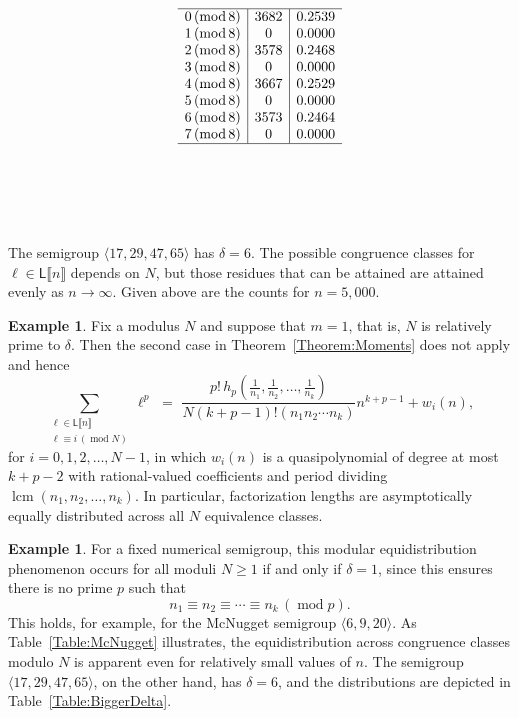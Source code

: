 \documentclass[10pt,reqno]{amsart}
\newcommand{\Le}{\mathsf{L}}
\newcommand{\lcm}{\operatorname{lcm}}
\providecommand{\multi}[1]{\llbracket #1 \rrbracket}
\newcommand{\0}{\color{lightgray}0}
\renewcommand{\pmod}[1]{\,(\operatorname{mod} #1)}
\renewcommand\>{\rangle}
\newcommand\<{\langle}
\theoremstyle{plain}
\theoremstyle{definition}
\newtheorem{Example}[equation]{Example}
\begin{document}
\begin{table}
\begin{equation*}
\begin{array}{c@{}c|c|c}
\hline
0 \pmod{ 8 } &&   3682  &   0.2539 \\
1 \pmod{ 8 } &&   0     &   0.0000 \\
2 \pmod{ 8 } &&   3578  &   0.2468 \\
3 \pmod{ 8 } &&   0     &   0.0000 \\
4 \pmod{ 8 } &&   3667  &   0.2529 \\
5 \pmod{ 8 } &&   0     &   0.0000 \\
6 \pmod{ 8 } &&   3573  &   0.2464 \\
7 \pmod{ 8 } &&   0     &   0.0000 \\
\hline
\\
\\
\\
\\
\\
\end{array}
\end{equation*}
\caption{The semigroup $\<17, 29, 47, 65\>$ has $\delta = 6$.
The possible congruence classes for $\ell \in \Le\multi{n}$ depends on $N$, but those residues that can be attained are attained evenly as $n \to \infty$.  Given above are the counts for $n=5{,}000$.}
\label{Table:BiggerDelta}
\end{table}

\begin{Example}
Fix a modulus $N$ and suppose that $m=1$, that is, $N$ is relatively prime to $\delta$.  Then the second case in 
Theorem~\ref{Theorem:Moments} does not apply and hence
\begin{equation*}
\sum_{\substack{\ell \in \Le\multi{n} \\ \ell \equiv i \pmod{N}}} \!\!\!\!\!\!\!\! \ell^p \,\, =\,\,
 \dfrac{p! \, h_p ( \frac{1}{n_1}, \frac{1}{n_2}, \ldots, \frac{1}{n_k} )}{N(k + p - 1)! (n_1 n_2 \cdots n_k)}  n^{k+p-1} + w_i(n),
\end{equation*}
for $i=0,1,2,\ldots,N-1$, in which $w_i(n)$ is a quasipolynomial of degree at most $k+p-2$ with rational-valued coefficients and period dividing $\lcm(n_1,n_2,\ldots,n_k)$.  In particular, factorization lengths are asymptotically equally distributed across all $N$ equivalence classes. 
\end{Example}

\begin{Example}
For a fixed numerical semigroup, this modular equidistribution 
phenomenon occurs for all moduli $N \ge 1$ if and only if $\delta = 1$, since this ensures there is no
prime $p$ such that 
\begin{equation*}
n_1 \equiv n_2 \equiv \cdots \equiv n_k \pmod{p}.
\end{equation*}
This holds, for example, for the McNugget semigroup $\<6,9,20\>$.  As Table~\ref{Table:McNugget} illustrates, the equidistribution across congruence classes modulo $N$ is apparent even for relatively small values of $n$.  The semigroup $\<17, 29, 47, 65\>$, on the other hand, has $\delta = 6$, and the distributions are depicted in Table~\ref{Table:BiggerDelta}.  
\end{Example}
\end{document}
